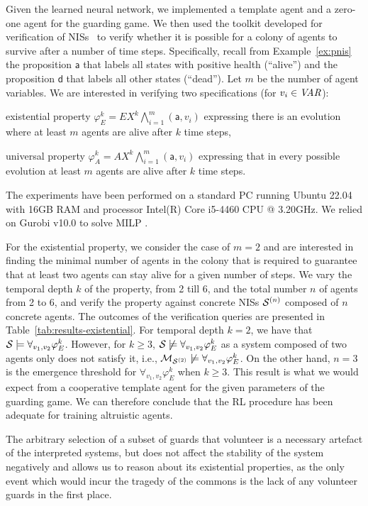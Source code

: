 Given the learned neural network, we implemented a template agent and a
zero-one agent for the guarding game. We then used the \venmas toolkit
developed for verification of NISs~\cite{Akintunde+20b} to verify whether it is
possible for a colony of agents to survive after a number of time steps.
%
Specifically, recall from Example~\ref{ex:pnis} the proposition $\mathsf{a}$
that labels all states with positive health (``alive'') and the proposition
$\mathsf{d}$ that labels all other states (``dead'').
%
Let $m$ be the number of agent variables. We are interested in verifying two
specifications (for $v_i \in\it{VAR}$):
\begin{inparaenum}[\it (i)]
\item existential property
  $\varphi^k_E = EX^k \bigwedge_{i=1}^m(\mathsf{a},v_i)$ 
  expressing there is an evolution where at least $m$ agents are alive after
  $k$ time steps,
\item universal property $\varphi^k_A = AX^k \bigwedge_{i=1}^m(\mathsf{a},v_i)$
  expressing that in every possible evolution at least $m$ agents are alive
  after $k$ time steps.
\end{inparaenum}
%
The experiments have been performed on a standard PC running Ubuntu 22.04 with
16GB RAM and processor Intel(R) Core i5-4460 CPU @ 3.20GHz. We relied on Gurobi
v10.0 to solve MILP \cite{Gurobi+16a}.

For the existential property, we consider the case of $m=2$ and are interested
in finding the minimal number of agents in the colony that is required to
guarantee that at least two agents can stay alive for a given number of
steps. We vary the temporal depth $k$ of the property, from 2 till 6, and the
total number $n$ of agents from 2 to 6, and verify the property against
concrete NISs $\mathcal{S}^{(n)}$ composed of $n$ concrete agents.  The outcomes of the
verification queries are presented in Table~\ref{tab:results-existential}.
%
For temporal depth $k=2$, we have that
$\mathcal S\models \forall_{v_1,v_2}\varphi^k_E$. However, for $k\geq 3$,
$\mathcal S\not\models\forall_{v_1,v_2}\varphi^k_E$ as a system composed of two
agents only does not satisfy it, i.e.,
$\mathcal{M}_{\mathcal{S}^{(2)}}\not\models\forall_{v_1,v_2}\varphi^k_E$. On the other hand, $n=3$ is
the emergence threshold for $\forall_{v_1,v_2}\varphi^k_E$ when $k\geq 3$. This
result is what we would expect from a cooperative template agent for the given
parameters of the guarding game. We can therefore conclude that the RL
procedure has been adequate for training altruistic agents.

The arbitrary selection of a subset of guards that volunteer is a
necessary artefact of the interpreted systems, but does not affect the
stability of the system negatively and allows us to reason about its
existential properties, as the only event which would incur the tragedy of the
commons is the lack of any volunteer guards in the first place.


